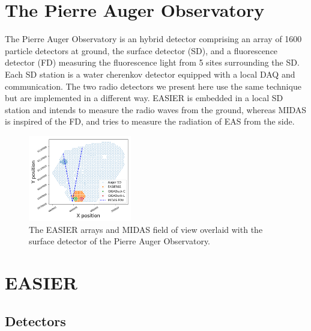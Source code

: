 \documentclass{PoS}
\begin{document}
\section{The Pierre Auger Observatory}
The Pierre Auger Observatory is an hybrid detector comprising an array of 1600 particle detectors at ground, the surface detector (SD), and a fluorescence detector (FD) measuring the fluorescence light from 5 sites surrounding the SD. Each SD station is a water cherenkov detector  equipped with a local DAQ and communication. 
The two radio detectors we present here use the same technique but are implemented in a different way. EASIER is embedded in a local SD station and intends to measure the radio waves from the ground, whereas MIDAS is inspired of the FD, and tries to measure the radiation of EAS from the side.
\begin{figure}[t]
\centering
\includegraphics[width=0.4\textwidth]{layoutGHz.png}

\caption{The EASIER arrays and MIDAS field of view overlaid with the surface detector of the Pierre Auger Observatory.}
\label{fig:ghzlayout}
\end{figure}

\section{EASIER}
\subsection{Detectors}
\end{document}
